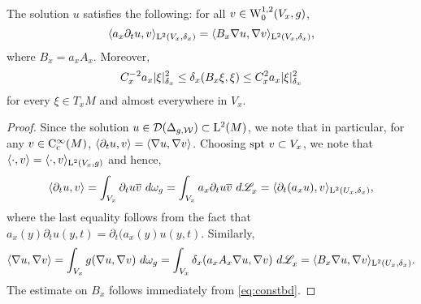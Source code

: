 \documentclass[a4paper, 12pt]{amsart}
\begin{document}
\begin{lemma}
\label{eq:soln1}
The solution $u$ satisfies the following: for all $v \in \SobH[0]{1}(V_x,g)$, 
	\begin{equation} 
	\label{eq:testfn1}	 
	\inprod{a_x \partial_t u, v}_{\Lp{2}(V_x, \delta_x)} 
		= \inprod{ B_x \nabla u, \nabla v}_{\Lp{2}(V_x, \delta_x)},
	\end{equation}
where $B_x = a_x A_x$. Moreover,
\begin{equation}
\label{eq:coeff}
C_x^{-2} a_x \modulus{\xi}_{\delta_x}^2 \leq \delta_x(B_x \xi, \xi) 
	\leq C_x^2 a_x \modulus{\xi}_{\delta_x}^2
\end{equation} 
for every $\xi \in T_xM$ and almost everywhere in $V_x$. 
\end{lemma}
\begin{proof}
Since the solution $u \in \dom(\Delta_{g,\cW}) \subset \Lp{2}(M)$, we
note that in particular, for any $v \in \Ck[c]{\infty}(M)$, 
$\inprod{\partial_t u, v} = \inprod{\nabla u, \nabla v}$.
Choosing $\spt v \subset V_x$, we note that $\inprod{\cdot, v} = \inprod{\cdot, v}_{\Lp{2}(V_x,g)}$
and hence,
$$\inprod{\partial_t u, v} = \int_{V_x} \partial_t u\conj{v}\ d\omega_g 
	= \int_{V_x} a_x \partial_t  u \conj{v}\ d\Leb_x
	= \inprod{\partial_t (a_x u), v}_{\Lp{2}(U_x, \delta_x)},$$
where the last equality follows from the fact that 
$a_x(y) \partial_t u(y,t) = \partial_t (a_x(y)u(y,t).$
Similarly,
$$\inprod{\nabla u, \nabla v} 
	= \int_{V_x} g(\nabla u, \nabla v)\ d\omega_g
	= \int_{V_x} \delta_x(a_x A_x \nabla u, \nabla v)\ d\Leb_x
	= \inprod{B_x \nabla u, \nabla v}_{\Lp{2}(U_x, \delta_x)}.$$
The estimate on $B_x$ follows immediately from
\eqref{eq:constbd}.
\end{proof} 
\end{document}
